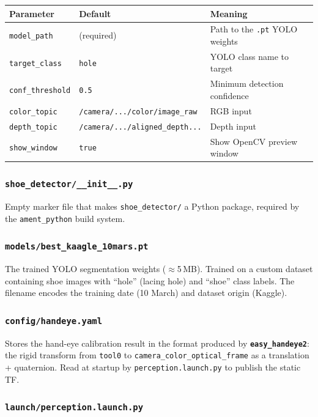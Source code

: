 \documentclass[11pt,a4paper]{article}
\newcommand{\pkg}[1]{\texttt{\textbf{#1}}}
\newcommand{\file}[1]{\texttt{#1}}
\begin{document}
\begin{center}
\begin{tabular}{|l|l|p{6cm}|}
\hline
\textbf{Parameter} & \textbf{Default} & \textbf{Meaning} \\
\hline
\texttt{model\_path} & (required) & Path to the \texttt{.pt} YOLO weights \\
\texttt{target\_class} & \texttt{hole} & YOLO class name to target \\
\texttt{conf\_threshold} & \texttt{0.5} & Minimum detection confidence \\
\texttt{color\_topic} & \texttt{/camera/.../color/image\_raw} & RGB input \\
\texttt{depth\_topic} & \texttt{/camera/.../aligned\_depth...} & Depth input \\
\texttt{show\_window} & \texttt{true} & Show OpenCV preview window \\
\hline
\end{tabular}
\end{center}

\subsubsection{\file{shoe\_detector/\_\_init\_\_.py}}

Empty marker file that makes \texttt{shoe\_detector/} a Python package,
required by the \texttt{ament\_python} build system.

\subsubsection{\file{models/best\_kaagle\_10mars.pt}}

The trained YOLO segmentation weights ($\approx$5\,MB). Trained on a custom
dataset containing shoe images with ``hole'' (lacing hole) and ``shoe'' class
labels. The filename encodes the training date (10 March) and dataset origin
(Kaggle).

\subsubsection{\file{config/handeye.yaml}}

Stores the hand-eye calibration result in the format produced by
\pkg{easy\_handeye2}: the rigid transform from \texttt{tool0} to
\texttt{camera\_color\_optical\_frame} as a translation + quaternion.
Read at startup by \file{perception.launch.py} to publish the static TF.

\subsubsection{\file{launch/perception.launch.py}}
\end{document}
